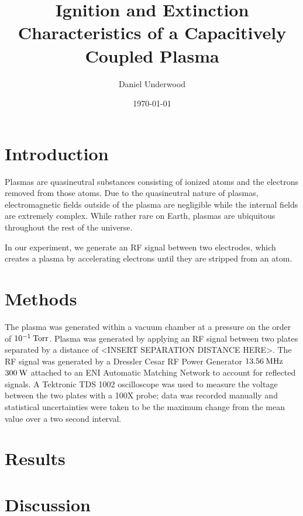 \documentclass[reprint]{revtex4-1}
\begin{document}
\title{Ignition and Extinction Characteristics of a Capacitively Coupled Plasma}
\author{Daniel Underwood}
\date{\today}

\begin{abstract}

\end{abstract}
\maketitle

\section{Introduction}
Plasmas are quasineutral substances consisting of ionized atoms and the electrons removed from those atoms. Due to the quasineutral nature of plasmas, electromagnetic fields outside of the plasma are negligible while the internal fields are extremely complex. While rather rare on Earth, plasmas are ubiquitous throughout the rest of the universe.

In our experiment, we generate an RF signal between two electrodes, which creates a plasma by accelerating electrons until they are stripped from an atom.

\section{Methods}

The plasma was generated within a vacuum chamber at a pressure on the order of $10^{-1}\:\rm{Torr}$. Plasma was generated by applying an RF signal between two plates separated by a distance of <INSERT SEPARATION DISTANCE HERE>. The RF signal was generated by a Dressler Cesar RF Power Generator $13.56\:\rm{MHz}$ $300\:\rm{W}$ attached to an ENI Automatic Matching Network to account for reflected signals. A Tektronic TDS 1002 oscilloscope was used to measure the voltage between the two plates with a 100X probe; data was recorded manually and statistical uncertainties were taken to be the maximum change from the mean value over a two second interval.

\section{Results}

\section{Discussion}
\end{document}
